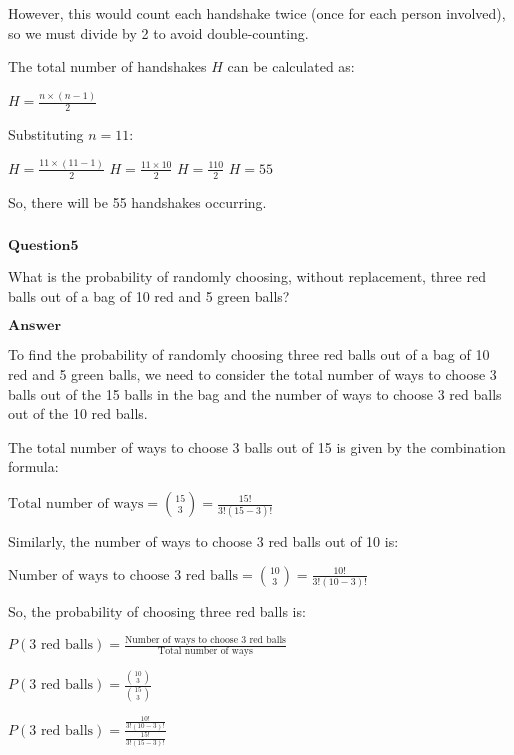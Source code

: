 \documentclass[11pt]{article}
\makeatletter
\newcommand{\boxspacing}{\kern\kvtcb@left@rule\kern\kvtcb@boxsep}
\newcommand{\prompt}[4]{
        {\ttfamily\llap{{\color{#2}[#3]:\hspace{3pt}#4}}\vspace{-\baselineskip}}
    }
\makeatother
\begin{document}
However, this would count each handshake twice (once for each person
involved), so we must divide by 2 to avoid double-counting.

The total number of handshakes $ H $ can be calculated as:

$ H = \frac{n \times (n - 1)}{2} $

Substituting $ n = 11 $:

$ H = \frac{11 \times (11 - 1)}{2} $ $ H = \frac{11 \times 10}{2} $
$ H = \frac{110}{2} $ $ H = 55 $

So, there will be 55 handshakes occurring.

    \begin{tcolorbox}[breakable, size=fbox, boxrule=1pt, pad at break*=1mm,colback=cellbackground, colframe=cellborder]
\prompt{In}{incolor}{ }{\boxspacing}
\begin{Verbatim}[commandchars=\\\{\}]

\end{Verbatim}
\end{tcolorbox}

    $\textbf{Question5}$

What is the probability of randomly choosing, without replacement, three
red balls out of a bag of 10 red and 5 green balls?

$\textbf{Answer}$

    To find the probability of randomly choosing three red balls out of a
bag of 10 red and 5 green balls, we need to consider the total number of
ways to choose 3 balls out of the 15 balls in the bag and the number of
ways to choose 3 red balls out of the 10 red balls.

The total number of ways to choose 3 balls out of 15 is given by the
combination formula:

$ \text{Total number of ways} = \binom{15}{3} = \frac{15!}{3!(15-3)!}
$

Similarly, the number of ways to choose 3 red balls out of 10 is:

$ \text{Number of ways to choose 3 red balls} = \binom{10}{3} =
\frac{10!}{3!(10-3)!} $

So, the probability of choosing three red balls is:

$ P(\text{3 red balls}) =
\frac{\text{Number of ways to choose 3 red balls}}{\text{Total number of ways}}
$

$ P(\text{3 red balls}) = \frac{\binom{10}{3}}{\binom{15}{3}} $

$ P(\text{3 red balls}) =
\frac{\frac{10!}{3!(10-3)!}}{\frac{15!}{3!(15-3)!}} $
\end{document}
